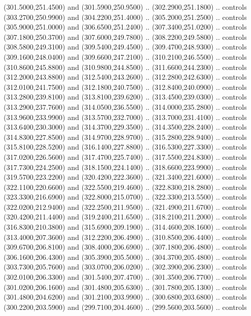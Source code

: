 {\begin{scope}[y=0.80pt, x=0.80pt, yscale=-1, xscale=1, inner sep=0pt, outer sep=0pt, #1]
      (301.5000,251.4500) and (301.5900,250.9500) .. (302.2900,251.1800) .. controls
      (303.2700,250.9900) and (304.2200,251.4000) .. (305.2000,251.2500) .. controls
      (305.9000,251.0000) and (306.6500,251.2400) .. (307.3400,251.0200) .. controls
      (307.1800,250.3700) and (307.6000,249.7800) .. (308.2200,249.5800) .. controls
      (308.5800,249.3100) and (309.5400,249.4500) .. (309.4700,248.9300) .. controls
      (309.1600,248.0400) and (309.6600,247.2100) .. (310.2100,246.5500) .. controls
      (310.8600,245.8800) and (310.9800,244.8500) .. (311.6600,244.2300) .. controls
      (312.2000,243.8800) and (312.5400,243.2600) .. (312.2800,242.6300) .. controls
      (312.0100,241.7500) and (312.1800,240.7500) .. (312.8400,240.0900) .. controls
      (313.2800,239.8100) and (313.8100,239.6200) .. (313.4500,239.0300) .. controls
      (313.2900,237.7600) and (314.0500,236.5500) .. (314.0000,235.2800) .. controls
      (313.9600,233.9900) and (313.5700,232.7000) .. (313.7000,231.4100) .. controls
      (313.6400,230.3000) and (314.3700,229.3500) .. (314.3500,228.2400) .. controls
      (314.8300,227.8500) and (314.9700,228.9700) .. (315.2800,228.9400) .. controls
      (315.8100,228.5200) and (316.1400,227.8800) .. (316.5300,227.3300) .. controls
      (317.0200,226.5600) and (317.4700,225.7400) .. (317.5500,224.8300) .. controls
      (317.7300,224.2500) and (318.1500,224.1400) .. (318.6600,223.9900) .. controls
      (319.5700,223.2200) and (320.4200,222.3600) .. (321.3400,221.6000) .. controls
      (322.1100,220.6600) and (322.5500,219.4600) .. (322.8300,218.2800) .. controls
      (323.3300,216.6900) and (322.8000,215.0700) .. (322.3300,213.5500) .. controls
      (322.0200,212.9400) and (322.2500,211.9500) .. (321.4900,211.6700) .. controls
      (320.4200,211.4400) and (319.2400,211.6500) .. (318.2100,211.2000) .. controls
      (316.8300,210.3800) and (315.6900,209.1900) .. (314.4600,208.1600) .. controls
      (313.4000,207.3600) and (312.2200,206.4900) .. (310.8500,206.4400) .. controls
      (309.6700,206.8100) and (308.4000,206.6900) .. (307.1800,206.4800) .. controls
      (306.1600,206.4300) and (305.3900,205.5000) .. (304.3700,205.4800) .. controls
      (303.7300,205.7600) and (303.0700,206.0200) .. (302.3900,206.2300) .. controls
      (302.0100,206.3300) and (301.5400,207.4700) .. (301.3500,206.7700) .. controls
      (301.0200,206.1600) and (301.4800,205.6300) .. (301.7800,205.1300) .. controls
      (301.4800,204.6200) and (301.2100,203.9900) .. (300.6800,203.6800) .. controls
      (300.2200,203.5900) and (299.7100,204.4600) .. (299.5600,203.5600) .. controls

\end{scope}}
